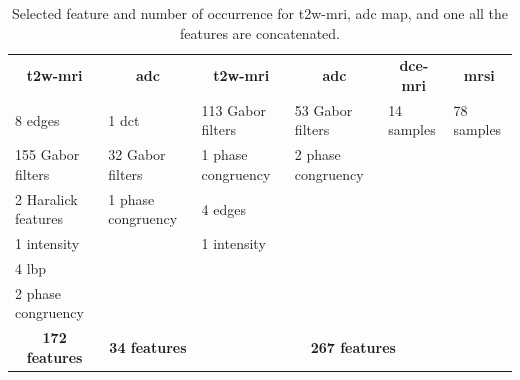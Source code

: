 \documentclass[num-refs]{wiley-article}
\begin{document}
\begin{table}
  \caption{Selected feature and number of occurrence for \acs*{t2w}-\acs*{mri}, \acs*{adc} map, and one all the features are concatenated.}
  \centering
  \scriptsize
  \begin{tabular}{llllll}
    \toprule
    \multicolumn{1}{c}{\textbf{\acs*{t2w}-\acs*{mri}}} & \multicolumn{1}{c}{\textbf{\acs*{adc}}} & \multicolumn{1}{c}{\textbf{\acs*{t2w}-\acs*{mri}}} & \multicolumn{1}{c}{\textbf{\acs*{adc}}} & \multicolumn{1}{c}{\textbf{\acs*{dce}-\acs*{mri}}} & \multicolumn{1}{c}{\textbf{\acs*{mrsi}}} \\
    \cmidrule(lr){1-1} \cmidrule(lr){2-2} \cmidrule(lr){3-6}
    8 edges & 1 \acs*{dct} & 113 Gabor filters & 53 Gabor filters & 14 samples  & 78 samples \\
    155 Gabor filters & 32 Gabor filters & 1 phase congruency & 2 phase congruency & & \\ 
    2 Haralick features & 1 phase congruency & 4 edges & & & \\
    1 intensity & & 1 intensity & & & \\
    4 \acs*{lbp} & & & & & \\
    2 phase congruency & & & & & \\
    \cmidrule(lr){1-1} \cmidrule(lr){2-2} \cmidrule(lr){3-6}
    \multicolumn{1}{c}{\textbf{172 features}} & \multicolumn{1}{c}{\textbf{34 features}} & \multicolumn{4}{c}{\textbf{267 features}} \\
    \bottomrule
  \end{tabular}
  \label{tab:selfeatocc}
\end{table}
\end{document}
